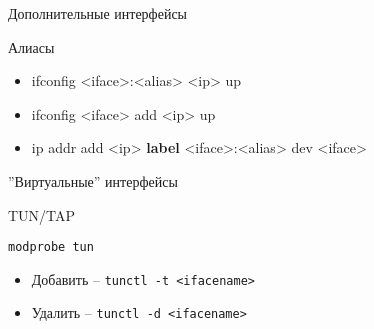 \begin{frame}{Дополнительные интерфейсы}
	\begin{block}{Алиасы}
		\begin{itemize}
			\item ifconfig <iface>:<alias> <ip> up
			\item ifconfig <iface> add <ip> up
			\item ip addr add <ip> {\bf label} <iface>:<alias> dev <iface>
		\end{itemize}
	\end{block}
\end{frame}

\begin{frame}{''Виртуальные'' интерфейсы}
	\begin{block}{TUN/TAP}

		{\tt modprobe tun}

		\begin{itemize}
			\item Добавить -- {\tt tunctl -t <ifacename>}
			\item Удалить -- {\tt tunctl -d <ifacename>}
		\end{itemize}
	\end{block}
\end{frame}


